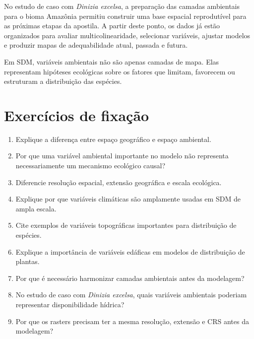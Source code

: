 No estudo de caso com \textit{Dinizia excelsa}, a preparação das camadas ambientais para o bioma Amazônia permitiu construir uma base espacial reprodutível para as próximas etapas da apostila. A partir deste ponto, os dados já estão organizados para avaliar multicolinearidade, selecionar variáveis, ajustar modelos e produzir mapas de adequabilidade atual, passada e futura.

\begin{conceito}[title={\faBook\quad Mensagem central}]
	Em SDM, variáveis ambientais não são apenas camadas de mapa. Elas representam hipóteses ecológicas sobre os fatores que limitam, favorecem ou estruturam a distribuição das espécies.
\end{conceito}

\section{Exercícios de fixação}

\begin{enumerate}
	\item Explique a diferença entre espaço geográfico e espaço ambiental.
	\item Por que uma variável ambiental importante no modelo não representa necessariamente um mecanismo ecológico causal?
	\item Diferencie resolução espacial, extensão geográfica e escala ecológica.
	\item Explique por que variáveis climáticas são amplamente usadas em SDM de ampla escala.
	\item Cite exemplos de variáveis topográficas importantes para distribuição de espécies.
	\item Explique a importância de variáveis edáficas em modelos de distribuição de plantas.
	\item Por que é necessário harmonizar camadas ambientais antes da modelagem?
	\item No estudo de caso com \textit{Dinizia excelsa}, quais variáveis ambientais poderiam representar disponibilidade hídrica?
	\item Por que os rasters precisam ter a mesma resolução, extensão e CRS antes da modelagem?
\end{enumerate}



